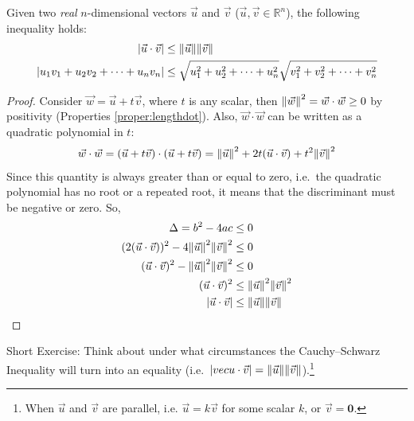 \begin{thm}
\label{thm:CauchySch}
Given two \textit{real} $n$-dimensional vectors $\vec{u}$ and $\vec{v}$ ($\vec{u}, \vec{v} \in \mathbb{R}^n$), the following inequality holds:
\begin{subequations}
\begin{align}
|\vec{u} \cdot \vec{v}| &\leq \norm{\vec{u}}\norm{\vec{v}} \\
|u_1v_1+u_2v_2+\cdots+u_nv_n| &\leq \sqrt{u_1^2+u_2^2+\cdots+u_n^2}\sqrt{v_1^2+v_2^2+\cdots+v_n^2}
\end{align}    
\end{subequations}
\end{thm}
\begin{proof}
Consider $\vec{w} = \vec{u} + t\vec{v}$, where $t$ is any scalar, then $\norm{\vec{w}}^2 = \vec{w}\cdot\vec{w} \geq 0$ by positivity (Properties \ref{proper:lengthdot}). Also, $\vec{w}\cdot\vec{w}$ can be written as a quadratic polynomial in $t$:
\begin{align*}
\vec{w}\cdot\vec{w} = (\vec{u} + t\vec{v}) \cdot (\vec{u} + t\vec{v}) = \norm{\vec{u}}^2 + 2t(\vec{u} \cdot \vec{v}) + t^2\norm{\vec{v}}^2
\end{align*}
Since this quantity is always greater than or equal to zero, i.e.\ the quadratic polynomial has no root or a repeated root, it means that the discriminant must be negative or zero. So,
\begin{align*}
\Delta = b^2 - 4ac &\leq 0 \\
(2(\vec{u} \cdot \vec{v}))^2 - 4\norm{\vec{u}}^2\norm{\vec{v}}^2 &\leq 0 \\
(\vec{u} \cdot \vec{v})^2 - \norm{\vec{u}}^2\norm{\vec{v}}^2 &\leq 0 \\
(\vec{u} \cdot \vec{v})^2 &\leq \norm{\vec{u}}^2\norm{\vec{v}}^2 \\
|\vec{u} \cdot \vec{v}| &\leq \norm{\vec{u}}\norm{\vec{v}}
\end{align*}
\end{proof}
Short Exercise: Think about under what circumstances the Cauchy–Schwarz Inequality will turn into an equality (i.e.\ $\abs{vec{u} \cdot \vec{v}} = \norm{\vec{u}}\norm{\vec{v}}$).\footnote{When $\vec{u}$ and $\vec{v}$ are parallel, i.e. $\vec{u} = k\vec{v}$ for some scalar $k$, or $\vec{v} = \textbf{0}$.}

